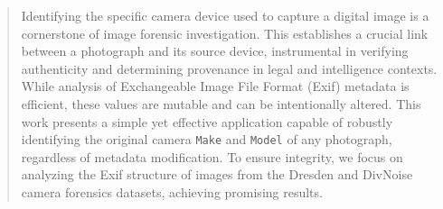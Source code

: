 \begin{abstract}
Identifying the specific camera device used to capture a digital image is a cornerstone of image forensic investigation. This establishes a crucial link between a photograph and its source device, instrumental in verifying authenticity and determining provenance in legal and intelligence contexts. While analysis of Exchangeable Image File Format (Exif) metadata is efficient, these values are mutable and can be intentionally altered. This work presents a simple yet effective application capable of robustly identifying the original camera \texttt{Make} and \texttt{Model} of any photograph, regardless of metadata modification. To ensure integrity, we focus on analyzing the Exif structure of images from the Dresden and DivNoise camera forensics datasets, achieving promising results.

\end{abstract}